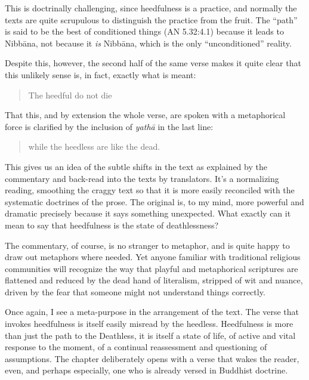 \documentclass[12pt,openany]{book}%
\begin{document}
This is doctrinally challenging, since heedfulness is a practice, and normally the texts are quite scrupulous to distinguish the practice from the fruit. The “path” is said to be the best of conditioned things (AN 5.32:4.1) because it leads to \textsanskrit{Nibbāna}, not because it \emph{is} \textsanskrit{Nibbāna}, which is the only “unconditioned” reality.

Despite this, however, the second half of the same verse makes it quite clear that this unlikely sense is, in fact, exactly what is meant:

\begin{verse}%
The heedful do not die

%
\end{verse}

That this, and by extension the whole verse, are spoken with a metaphorical force is clarified by the inclusion of \textit{\textsanskrit{yathā}} in the last line:

\begin{verse}%
while the heedless are like the dead.

%
\end{verse}

This gives us an idea of the subtle shifts in the text as explained by the commentary and back-read into the texts by translators. It’s a normalizing reading, smoothing the craggy text so that it is more easily reconciled with the systematic doctrines of the prose. The original is, to my mind, more powerful and dramatic precisely because it says something unexpected. What exactly can it mean to say that heedfulness is the state of deathlessness?

The commentary, of course, is no stranger to metaphor, and is quite happy to draw out metaphors where needed. Yet anyone familiar with traditional religious communities will recognize the way that playful and metaphorical scriptures are flattened and reduced by the dead hand of literalism, stripped of wit and nuance, driven by the fear that someone might not understand things correctly.

Once again, I see a meta-purpose in the arrangement of the text. The verse that invokes heedfulness is itself easily misread by the heedless. Heedfulness is more than just the path to the Deathless, it is itself a state of life, of active and vital response to the moment, of a continual reassessment and questioning of assumptions. The chapter deliberately opens with a verse that wakes the reader, even, and perhaps especially, one who is already versed in Buddhist doctrine.
\end{document}
